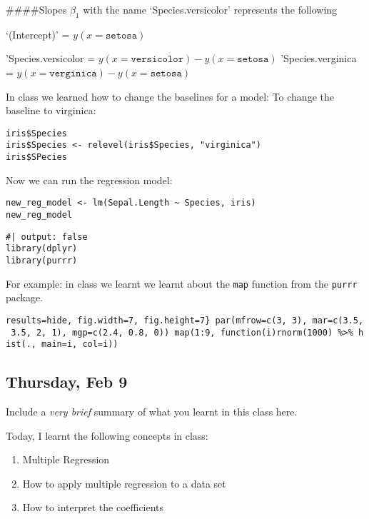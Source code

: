 \documentclass[
  letterpaper,
  DIV=11,
  numbers=noendperiod]{scrartcl}
\providecommand{\tightlist}{%
  \setlength{\itemsep}{0pt}\setlength{\parskip}{0pt}}\usepackage{longtable,booktabs,array}
\begin{document}
\#\#\#\#Slopes \(\beta_1\) with the name `Species.versicolor' represents
the following

`(Intercept)' = \(y(x = \texttt{setosa})\)

'Species.versicolor =
\(y(x = \texttt{versicolor}) - y(x = \texttt{setosa})\)
'Species.verginica =
\(y(x = \texttt{verginica}) - y(x = \texttt{setosa})\)

In class we learned how to change the baselines for a model: To change
the baseline to virginica:

\begin{verbatim}
iris$Species
iris$Species <- relevel(iris$Species, "virginica")
iris$SPecies
\end{verbatim}

Now we can run the regression model:

\begin{verbatim}
new_reg_model <- lm(Sepal.Length ~ Species, iris)
new_reg_model
\end{verbatim}

\begin{verbatim}
#| output: false
library(dplyr)
library(purrr)
\end{verbatim}

For example: in class we learnt we learnt about the \texttt{map}
function from the \texttt{purrr} package.

\texttt{results=\textquotesingle{}hide\textquotesingle{},\ fig.width=7,\ fig.height=7\}\ par(mfrow=c(3,\ 3),\ mar=c(3.5,\ 3.5,\ 2,\ 1),\ mgp=c(2.4,\ 0.8,\ 0))\ map(1:9,\ function(i)rnorm(1000)\ \%\textgreater{}\%\ hist(.,\ main=i,\ col=i))}

\hypertarget{thursday-feb-9}{%
\subsection{Thursday, Feb 9}\label{thursday-feb-9}}

\begin{tcolorbox}[enhanced jigsaw, arc=.35mm, toptitle=1mm, breakable, colback=white, bottomrule=.15mm, opacityback=0, colbacktitle=quarto-callout-important-color!10!white, title=\textcolor{quarto-callout-important-color}{\faExclamation}\hspace{0.5em}{TIL}, bottomtitle=1mm, titlerule=0mm, leftrule=.75mm, coltitle=black, rightrule=.15mm, left=2mm, toprule=.15mm, colframe=quarto-callout-important-color-frame, opacitybacktitle=0.6]

Include a \emph{very brief} summary of what you learnt in this class
here.

Today, I learnt the following concepts in class:

\begin{enumerate}
\def\labelenumi{\arabic{enumi}.}
\tightlist
\item
  Multiple Regression
\item
  How to apply multiple regression to a data set
\item
  How to interpret the coefficients
\end{enumerate}

\end{tcolorbox}
\end{document}
